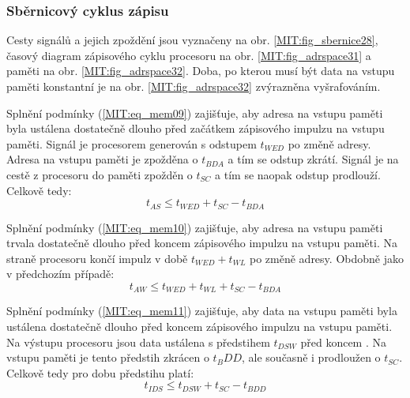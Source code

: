       \subsubsection{Sběrnicový cyklus zápisu}
        Cesty signálů a jejich zpoždění jsou vyznačeny na obr. \ref{MIT:fig_sbernice28}, časový 
        diagram zápisového cyklu procesoru na obr. \ref{MIT:fig_adrspace31} a paměti na obr. 
        \ref{MIT:fig_adrspace32}. Doba, po kterou musí být data na vstupu paměti konstantní je na 
        obr. \ref{MIT:fig_adrspace32} zvýrazněna vyšrafováním.
        
        Splnění podmínky (\ref{MIT:eq_mem09}) zajišťuje, aby adresa na vstupu paměti byla ustálena 
        dostatečně dlouho před začátkem zápisového impulzu na vstupu  
        paměti. Signál  je procesorem generován s odstupem \(t_{WED}\) po 
        změně adresy. Adresa na vstupu paměti je zpožděna o \(t_{BDA}\) a tím se odstup zkrátí. 
        Signál  je na cestě z procesoru do paměti zpožděn o \(t_{SC}\) a 
        tím se naopak odstup prodlouží. Celkově tedy:
        \begin{equation}\label{MIT:eq_mem09}
          t_{AS} \leq t_{WED} + t_{SC} - t_{BDA} 
        \end{equation}
        
        Splnění podmínky (\ref{MIT:eq_mem10}) zajišťuje, aby adresa na vstupu paměti trvala 
        dostatečně dlouho před koncem zápisového impulzu na vstupu  
        paměti. Na straně procesoru končí impulz v době \(t_{WED} + t_{WL}\) po změně adresy. 
        Obdobně jako v předchozím případě:
        \begin{equation}\label{MIT:eq_mem10}
          t_{AW} \leq t_{WED} + t_{WL} + t_{SC} - t_{BDA} 
        \end{equation}
        
        Splnění podmínky (\ref{MIT:eq_mem11}) zajišťuje, aby data na vstupu paměti byla ustálena 
        dostatečně dlouho před koncem zápisového impulzu na vstupu  
        paměti. Na výstupu procesoru jsou data ustálena s předstihem \(t_{DSW}\) před koncem 
        . Na vstupu paměti je tento předstih zkrácen o \(t_BDD\), ale 
        současně i prodloužen o \(t_{SC}\). Celkově tedy pro dobu předstihu platí:
        \begin{equation}\label{MIT:eq_mem11}
          t_{IDS} \leq t_{DSW} + t_{SC} - t_{BDD} 
        \end{equation}
       
